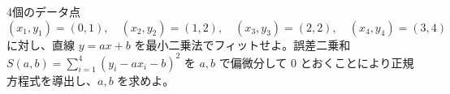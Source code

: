 
4個のデータ点
\[
(x_1,y_1)=(0,1),\quad (x_2,y_2)=(1,2),\quad (x_3,y_3)=(2,2),\quad (x_4,y_4)=(3,4)
\]
に対し、直線 $y = ax + b$ を最小二乗法でフィットせよ。誤差二乗和 $S(a,b) = \displaystyle\sum_{i=1}^{4}(y_i - ax_i - b)^2$ を $a, b$ で偏微分して $0$ とおくことにより正規方程式を導出し、$a, b$ を求めよ。
